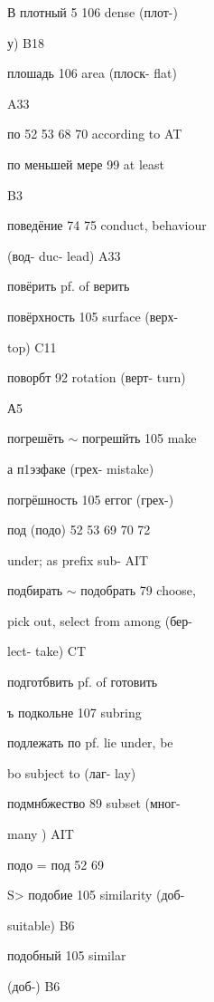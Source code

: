 \begin{minipage}[t]{0.475\textwidth}
\raggedright
\noindent В плотный 5 106 dense (плот-)\par
\noindent у) B18\par
\noindent плошадь 106 area (плоск- flat)\par
\noindent A33\par
\noindent по 52 53 68 70 according to AT\par
\noindent по меньшей мере 99 at least\par
\noindent B3\par
\noindent поведёние 74 75 conduct, behaviour\par
\noindent (вод- duc- lead) A33\par
\noindent повёрить pf. of верить\par
\noindent повёрхность 105 surface (верх-\par
\noindent top) C11\par
\noindent поворбт 92 rotation (верт- turn)\par
\noindent А5\par
\noindent погрешёть $\sim$ погрешйть 105 make\par
\noindent а п1эзфаке (грех- mistake)\par
\noindent погрёшность 105 еггог (грех-)\par
\noindent под (подо) 52 53 69 70 72\par
\noindent under; as prefix sub- AIT\par
\noindent подбирать $\sim$ подобрать 79 choose,\par
\noindent pick out, select from among (бер-\par
\noindent lect- take) CT\par
\noindent подготбвить pf. of готовить\par
\noindent ъ подкольне 107 subring\par
\noindent подлежать по pf. lie under, be\par
\noindent bo subject to (лаг- lay)\par
\noindent подмнбжество 89 subset (мног-\par
\noindent many ) AIT\par
\noindent подо = под 52 69\par
\noindent S> подобие 105 similarity (доб-\par
\noindent suitable) B6\par
\noindent подобный 105 similar\par
\noindent (доб-) B6\par

\end{minipage}
